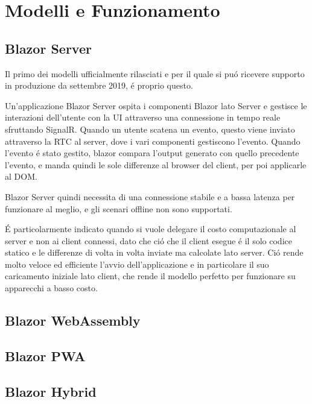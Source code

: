 \chapter{Modelli e Funzionamento}\label{cap:modefunz}
\section{Blazor Server}\label{sez:bserver}
Il primo dei modelli ufficialmente rilasciati e per il quale si pu\'o ricevere supporto in produzione da settembre 2019\cite{blazorServerRelease}, \'e proprio questo.

Un'applicazione Blazor Server ospita i componenti Blazor lato Server e gestisce le interazioni dell'utente con la UI attraverso una connessione in tempo reale sfruttando SignalR.
Quando un utente scatena un evento, questo viene inviato attraverso la RTC al server, dove i vari componenti gestiscono l'evento.
Quando l'evento \'e stato gestito, blazor compara l'output generato con quello precedente l'evento, e manda quindi le sole differenze al browser del client, per poi applicarle al DOM.\cite{blazorModelsScenarios}

Blazor Server quindi necessita di una connessione stabile e a bassa latenza per funzionare al meglio, e gli scenari offline non sono supportati.

\'E particolarmente indicato quando si vuole delegare il costo computazionale al server e non ai client connessi, dato che ci\'o che il client esegue \'e il solo codice statico e le differenze di volta in volta inviate ma calcolate lato server.
Ci\'o rende molto veloce ed efficiente l'avvio dell'applicazione e in particolare il suo caricamento iniziale lato client, che rende il modello perfetto per funzionare su apparecchi a basso costo.


\section{Blazor WebAssembly}\label{sez:bclient}
\section{Blazor PWA}\label{sez:bpwa}
\section{Blazor Hybrid}\label{sez:bhybrid}

